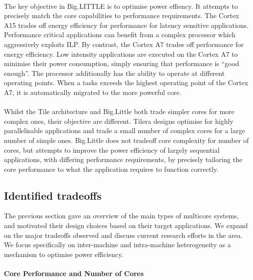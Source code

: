 \paragraph{} The key objective in Big.LITTLE is to optimise power effiency. It attempts to 
precisely match the core capabilities to performance requirements. The Cortex A15 trades off energy
efficiency for performance for latency sensitive applications. Performance critical applications
can benefit from a complex processor which aggressively exploits ILP. 
By contrast, the Cortex A7 trades off performance for energy efficiency. Low 
intensity applications are executed on the Cortex A7 to minimise their power 
consumption, simply ensuring that performance is ``good enough''.  The processor
additionally has the ability to operate at different operating points. When a tasks
exceeds the highest operating point of the Cortex A7, it is automatically migrated
to the more powerful core. 

\paragraph{} Whilst the Tile architecture and Big.Little both trade  simpler cores for 
more complex ones, their objective are different. Tilera designs optimise
for highly parallelisable applications and trade a small number of 
complex cores for a large number of simple ones. Big.Little does not
tradeoff core complexity for number of cores, but attempts to improve
the power efficiency of largely sequential applications, with differing
performance requirements,  by precisely tailoring the core performance to what
the application requires to function correctly. 

\subsection{Identified tradeoffs}

The previous section gave an overview of the main types of multicore systems, 
and motivated their design choices based on their target applications. 
We expand on the major tradeoffs observed and discuss current research efforts in the area. 
We focus specifically on inter-machine and intra-machine heterogeneity as a mechanism
to optimise power efficiency. 

\paragraph{Core Performance and Number of Cores}

